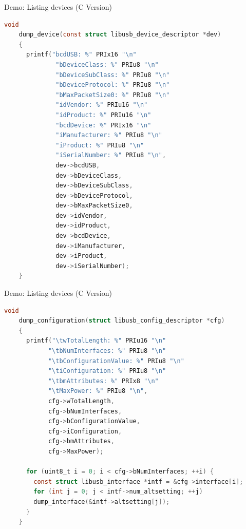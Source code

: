 \documentclass[pdf]{beamer}
\begin{document}
\begin{frame}[fragile]{Demo:  Listing devices (C Version)}
  \tiny
  \begin{lstlisting}[language=C]
    void
    dump_device(const struct libusb_device_descriptor *dev)
    {
      printf("bcdUSB: %" PRIx16 "\n"
              "bDeviceClass: %" PRIu8 "\n"
              "bDeviceSubClass: %" PRIu8 "\n"
              "bDeviceProtocol: %" PRIu8 "\n"
              "bMaxPacketSize0: %" PRIu8 "\n"
              "idVendor: %" PRIu16 "\n"
              "idProduct: %" PRIu16 "\n"
              "bcdDevice: %" PRIx16 "\n"
              "iManufacturer: %" PRIu8 "\n"
              "iProduct: %" PRIu8 "\n"
              "iSerialNumber: %" PRIu8 "\n",
              dev->bcdUSB,
              dev->bDeviceClass,
              dev->bDeviceSubClass,
              dev->bDeviceProtocol,
              dev->bMaxPacketSize0,
              dev->idVendor,
              dev->idProduct,
              dev->bcdDevice,
              dev->iManufacturer,
              dev->iProduct,
              dev->iSerialNumber);
    }
  \end{lstlisting}
\end{frame}

\begin{frame}[fragile]{Demo:  Listing devices (C Version)}
  \tiny
  \begin{lstlisting}[language=C]
    void
    dump_configuration(struct libusb_config_descriptor *cfg)
    {
      printf("\twTotalLength: %" PRIu16 "\n"
            "\tbNumInterfaces: %" PRIu8 "\n"
            "\tbConfigurationValue: %" PRIu8 "\n"
            "\tiConfiguration: %" PRIu8 "\n"
            "\tbmAttributes: %" PRIx8 "\n"
            "\tMaxPower: %" PRIu8 "\n",
            cfg->wTotalLength,
            cfg->bNumInterfaces,
            cfg->bConfigurationValue,
            cfg->iConfiguration,
            cfg->bmAttributes,
            cfg->MaxPower);

      for (uint8_t i = 0; i < cfg->bNumInterfaces; ++i) {
        const struct libusb_interface *intf = &cfg->interface[i];
        for (int j = 0; j < intf->num_altsetting; ++j)
        dump_interface(&intf->altsetting[j]);
      }
    }
  \end{lstlisting}
\end{frame}
\end{document}

